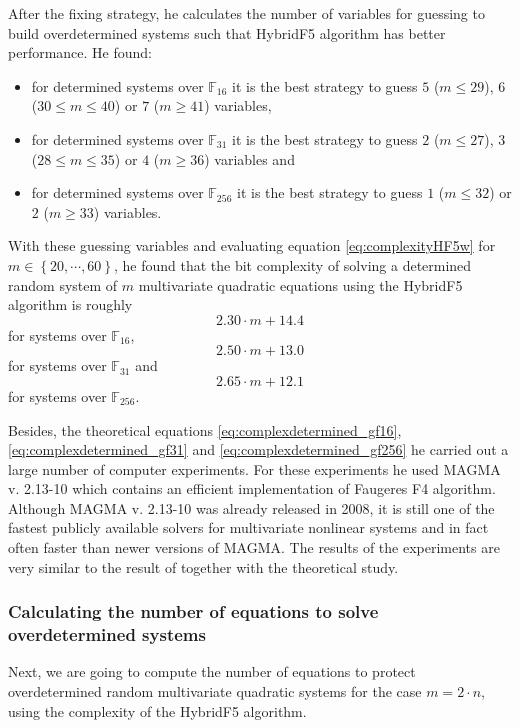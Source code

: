 After the fixing strategy, he calculates the number of variables for guessing to build overdetermined systems such that HybridF5 algorithm has better performance. He found:
\begin{itemize}
\item for determined systems over $\mathbb{F}_{16}$ it is the best strategy to guess $5$ ($m \leq 29$), $6$ ($30 \leq m \leq 40$) or $7$ ($m \geq 41$) variables,
\item for determined systems over $\mathbb{F}_{31}$ it is the best strategy to guess $2$ ($m \leq 27$), $3$ ($28 \leq m \leq 35$) or $4$ ($m \geq 36$) variables and
\item for determined systems over $\mathbb{F}_{256}$ it is the best strategy to guess $1$ ($m \leq 32$) or $2$ ($m \geq 33$) variables.
\end{itemize}

With these guessing variables and evaluating equation \eqref{eq:complexityHF5w} for $m\in \left\{20,\cdots, 60\right\}$, he found that the bit complexity of solving a determined random system of $m$ multivariate quadratic equations using the HybridF5 algorithm is roughly
\begin{equation}
2.30 \cdot m + 14.4
\label{eq:complexdetermined_gf16}
\end{equation}
for systems over $\mathbb{F}_{16}$,
\begin{equation}
2.50 \cdot m + 13.0
\label{eq:complexdetermined_gf31}
\end{equation}
for systems over $\mathbb{F}_{31}$ and
\begin{equation}
2.65 \cdot m + 12.1
\label{eq:complexdetermined_gf256}
\end{equation}
for systems over $\mathbb{F}_{256}$.

Besides, the theoretical equations \eqref{eq:complexdetermined_gf16}, \eqref{eq:complexdetermined_gf31} and \eqref{eq:complexdetermined_gf256} he carried out a large number of computer experiments. For these experiments he used MAGMA v. 2.13-10 which contains an efficient implementation of Faugeres F4 algorithm. Although MAGMA v. 2.13-10
was already released in 2008, it is still one of the fastest publicly available solvers for multivariate nonlinear systems and in fact often faster than newer versions of MAGMA. The results of the experiments are very similar to the result of together with the theoretical study.
\subsubsection{Calculating the number of equations to solve overdetermined systems}
\label{subsection:hybridF5overdetermined}
 Next, we are going to compute the number of equations to protect overdetermined random multivariate quadratic systems for the case $m=2\cdot n$, using the complexity of the HybridF5 algorithm.

